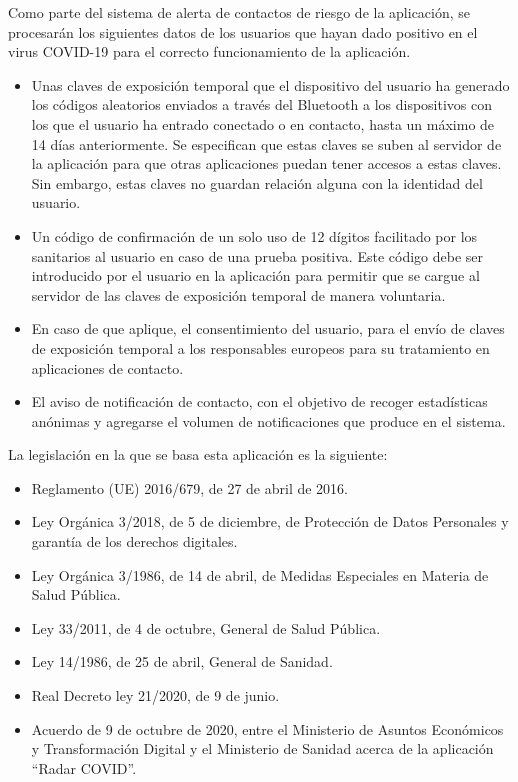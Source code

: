 \documentclass[11pt,a4paper,spanish]{article}
\begin{document}
Como parte del sistema de alerta de contactos de riesgo de la aplicación, se procesarán los siguientes datos de los usuarios que hayan dado positivo en el virus COVID-19 para el correcto funcionamiento de la aplicación.

\begin{itemize}
\item Unas claves de exposición temporal que el dispositivo del usuario ha generado los códigos aleatorios enviados a través del Bluetooth a los dispositivos con los que el usuario ha entrado conectado o en contacto, hasta un máximo de 14 días anteriormente. Se especifican que estas claves se suben al servidor de la aplicación para que otras aplicaciones puedan tener accesos a estas claves. Sin embargo, estas claves no guardan relación alguna con la identidad del usuario.
\item Un código de confirmación de un solo uso de 12 dígitos facilitado por los sanitarios al usuario en caso de una prueba positiva. Este código debe ser introducido por el usuario en la aplicación para permitir que se cargue al servidor de las claves de exposición temporal de manera voluntaria.
\item En caso de que aplique, el consentimiento del usuario, para el envío de claves de exposición temporal a los responsables europeos para su tratamiento en aplicaciones de contacto.
\item El aviso de notificación de contacto, con el objetivo de recoger estadísticas anónimas y agregarse el volumen de notificaciones que produce en el sistema.
\end{itemize}

La legislación en la que se basa esta aplicación es la siguiente:

\begin{itemize}
\item Reglamento (UE) 2016/679, de 27 de abril de 2016.
\item Ley Orgánica 3/2018, de 5 de diciembre, de Protección de Datos Personales y garantía de los derechos digitales.
\item Ley Orgánica 3/1986, de 14 de abril, de Medidas Especiales en Materia de Salud Pública.
\item Ley 33/2011, de 4 de octubre, General de Salud Pública.
\item Ley 14/1986, de 25 de abril, General de Sanidad.
\item Real Decreto ley 21/2020, de 9 de junio.
\item Acuerdo de 9 de octubre de 2020, entre el Ministerio de Asuntos Económicos y Transformación Digital y el Ministerio de Sanidad acerca de la aplicación “Radar COVID”.
\end{itemize}
\end{document}
